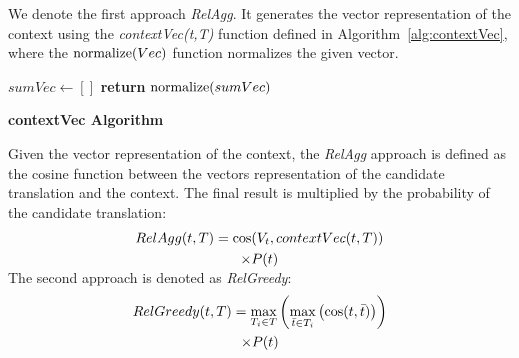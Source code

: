 We denote the first approach \emph{RelAgg}. It generates the vector representation of the context using the \emph{contextVec(t,T)} function defined in Algorithm~\ref{alg:contextVec}, %
where %
the $\textnormal{normalize}(Vec)$ function normalizes the given vector.

\begin{algorithm}[h]

$sumVec\leftarrow []$\;
\textbf{return} $\textnormal{normalize}(sumVec)$\;
\caption{{\bf contextVec Algorithm} \label{alg:contextVec}}
\end{algorithm}

Given the vector representation of the context, the \emph{RelAgg} approach is defined as the cosine function between the vectors representation of the candidate translation and the context. The final result is multiplied by the probability of the candidate  translation:
\vspace{-0.2cm}
\begin{multline}
  RelAgg(t,T)=\cos(V_t,contextVec(t,T))\\ \times P(t)
  \label{formula:relagg}
\vspace{-0.4cm}
\end{multline}

The second approach is denoted as \emph{RelGreedy}: 
\vspace{-0.2cm}
\begin{multline}
  \label{formula:relgreedy}
  RelGreedy(t,T)=\max_{T_i \in T}\left(\max_{\bar{t} \in T_i} \left(\cos(t,\bar{t}) \right) \right) \\ \times P(t)
\vspace{-0.4cm}
\end{multline}

